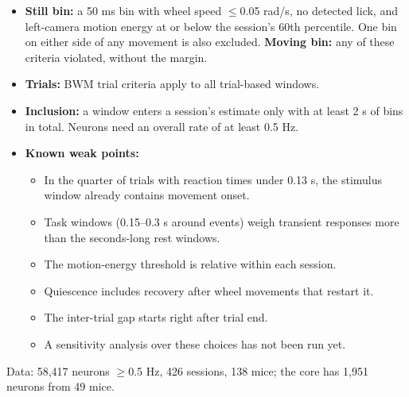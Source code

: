 \documentclass[10pt,a4paper]{article}
\begin{document}
\begin{itemize}
\item \textbf{Still bin:} a 50 ms bin with wheel speed $\leq$0.05 rad/s, no detected lick, and left-camera motion energy at or below the session's 60th percentile. One bin on either side of any movement is also excluded. \textbf{Moving bin:} any of these criteria violated, without the margin.
\item \textbf{Trials:} BWM trial criteria apply to all trial-based windows.
\item \textbf{Inclusion:} a window enters a session's estimate only with at least 2 s of bins in total. Neurons need an overall rate of at least 0.5 Hz.
\item \textbf{Known weak points:} 
\begin{itemize}
\item In the quarter of trials with reaction times under 0.13 s, the stimulus window already contains movement onset.
\item Task windows (0.15--0.3 s around events) weigh transient responses more than the seconds-long rest windows.
\item The motion-energy threshold is relative within each session.
\item Quiescence includes recovery after wheel movements that restart it.
\item The inter-trial gap starts right after trial end.
\item A sensitivity analysis over these choices has not been run yet.
\end{itemize}
\end{itemize}
Data: 58,417 neurons $\geq$0.5 Hz, 426 sessions, 138 mice; the core has 1,951 neurons from 49 mice.
\end{document}
